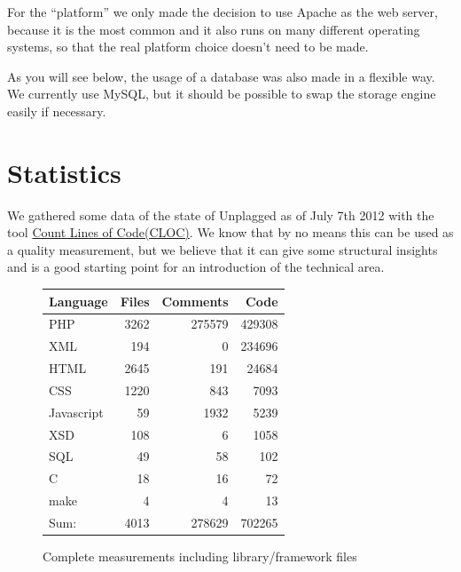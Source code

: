 For the \enquote{platform} we only made the decision to use Apache as the web server, because it is the most common\citep{webServers} and it also runs on many different operating systems, so that the real platform choice doesn't need to be made.

As you will see below, the usage of a database was also made in a flexible way. We currently use MySQL, but it should be possible to swap the storage engine easily if necessary.

\section{Statistics}

We gathered some data of the state of Unplagged as of July 7th 2012 with the tool \href{http://cloc.sourceforge.net/}{Count Lines of Code(CLOC)}. We know that by no means this can be used as a quality measurement, but we believe that it can give some structural insights and is a good starting point for an introduction of the technical area.


\begin{figure}[!h]
  \centering
\begin{tabular}{lrrr}
\toprule
Language & Files & Comments & Code \\
\midrule
PHP & 3262 & 275579    &     429308 \\
XML & 194 & 0 & 234696 \\
HTML                     &         2645       &     191     &     24684 \\
CSS                      &         1220      &      843     &      7093 \\
Javascript                & 59       &       1932     &      5239 \\
XSD                      &           108     &         6       &    1058 \\
SQL                    &        49        &     58      &      102 \\
C                      &            18           &  16       &      72 \\
make                  &                     4      &       4    &         13 \\
\midrule
Sum: & 4013 & 278629 & 702265 \\
\bottomrule
\end{tabular}
  \caption{Complete measurements including library/framework files}
  \label{tab:completeMeasure}
\end{figure}

